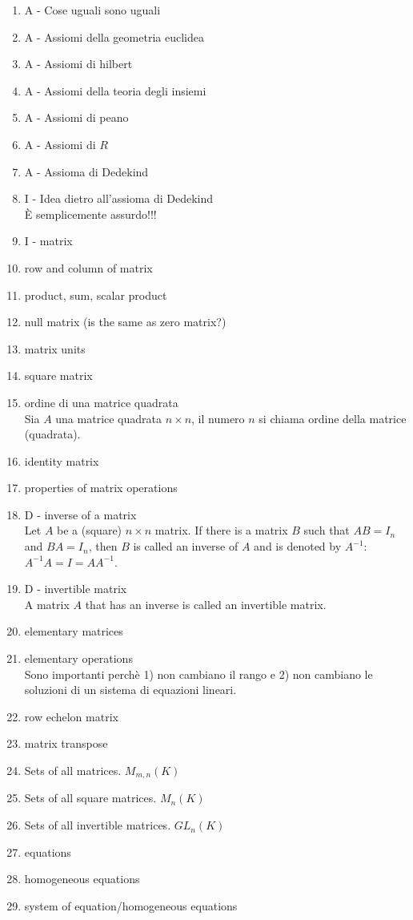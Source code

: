 \documentclass[]{article}
\begin{document}
\begin{enumerate}
	\item A - Cose uguali sono uguali
	\item A - Assiomi della geometria euclidea
	\item A - Assiomi di hilbert
	\item A - Assiomi della teoria degli insiemi
	\item A - Assiomi di peano
	\item A - Assiomi di $R$
	\item A - Assioma di Dedekind
	\item I - Idea dietro all'assioma di Dedekind \\
			  \`E semplicemente assurdo!!!

	\item I - matrix
	\item row and column of matrix
	\item product, sum, scalar product		
	\item null matrix (is the same as zero matrix?)
	\item matrix units
	\item square matrix
	\item ordine di una matrice quadrata \\
	      Sia $A$ una matrice quadrata $n \times n$, il numero $n$ si chiama ordine della matrice (quadrata). 
	\item identity matrix		
	\item properties of matrix operations
	\item D - inverse of a matrix \\
		  Let $A$ be a (square) $n \times n$ matrix. If there is a matrix $B$ such that $AB=I_n$ and $BA=I_n$, then $B$ is called an inverse of $A$ and is denoted by $A^{-1}$: $A^{-1}A=I=AA^{-1}$.
	\item D - invertible matrix \\
	      A matrix $A$ that has an inverse is called an invertible matrix.
	\item elementary matrices
	\item elementary operations \\
		  Sono importanti perch\`e 1) non cambiano il rango e 2) non cambiano le soluzioni di un sistema di equazioni lineari.
	\item row echelon matrix
	\item matrix transpose 
	\item Sets of all matrices. $M_{m,n}(K)$
	\item Sets of all square matrices. $M_n(K)$
	\item Sets of all invertible matrices. $GL_n(K)$
	\item equations
	\item homogeneous equations
	\item system of equation/homogeneous equations	


\end{enumerate}
\end{document}
